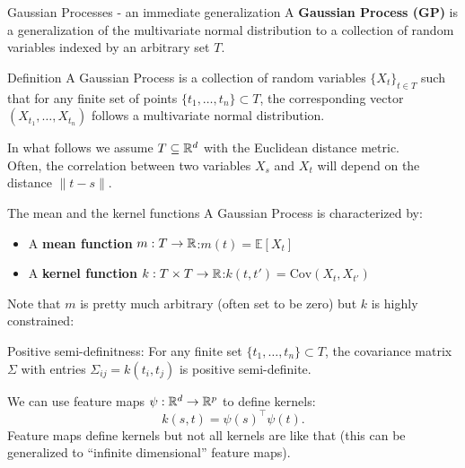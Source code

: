 \documentclass[11pt,handout,aspectratio=169]{beamer}
\begin{document}
\begin{frame}{Gaussian Processes - an immediate generalization}
A \textbf{Gaussian Process (GP)} is a generalization of the multivariate normal distribution to a collection of random variables indexed by an \alert{arbitrary} set \( T \).

\begin{alertblock}{Definition}
A Gaussian Process is a collection of random variables $\{X_t\}_{t\in T}$ such that for any finite set of points \( \{t_1, \dots, t_n\} \subset T \), the corresponding vector \( (X_{t_1}, \dots, X_{t_n}) \) follows a multivariate normal distribution.
\end{alertblock}

In what follows we assume $T\subseteq \mathbb R^d$ with the Euclidean distance metric.\\[2mm]

Often, the correlation between two variables $X_s$ and $X_t$ will depend on the distance $\|t-s\|$.
\end{frame}

\begin{frame}{The mean and the kernel functions}
	A Gaussian Process is characterized  by:
    \begin{itemize}
        \item A \textbf{mean function} $m:T\to \mathbb R$:\quad  \( m(t) = \mathbb{E}[X_t] \)
        \item A \textbf{kernel function} $k:T\times T\to \mathbb R$:\quad  \( k(t, t') = \text{Cov}(X_t, X_{t'}) \)
    \end{itemize}
 	Note that $m$ is pretty much arbitrary (often set to be zero) but $k$ is highly constrained:\\[2mm]
 	\begin{alertblock}{Positive semi-definitness:}
 		For any finite set \( \{t_1, \dots, t_n\}\subset T \), the covariance matrix \( \Sigma \) with entries \( \Sigma_{ij} = k(t_i, t_j) \) is positive semi-definite.
 	\end{alertblock}
 We can use feature maps $\psi:\mathbb R^d\to \mathbb R^p$ to define kernels: 
  $$k(s,t) = \psi(s)^\top\psi(t).$$ 
Feature maps define kernels but not all kernels are like that (this can be generalized to ``infinite dimensional'' feature maps).
\end{frame}
\end{document}
